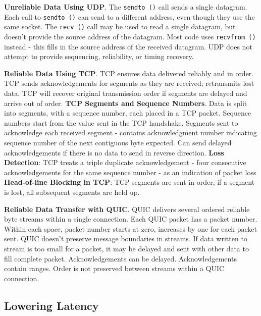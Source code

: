 \documentclass{article}
\begin{document}
\vspace{\baselineskip}
\textbf{Unreliable Data Using UDP}.
The \texttt{sendto ()} call sends a single datagram.
Each call to \texttt{sendto ()} can send to a different address, even though they use the same socket.
The \texttt{recv ()} call may be used to read a single datagram, but doesn't provide the source address of the datagram.
Most code uses \texttt{recvfrom ()} instead {-} this fills in the source address of the received datagram.
UDP does not attempt to provide sequencing, reliability, or timing recovery.

\vspace{\baselineskip}
\textbf{Reliable Data Using TCP}.
TCP ensures data delivered reliably and in order.
TCP sends acknowledgements for segments as they are received; retransmits lost data.
TCP will recover original transmission order if segments are delayed and arrive out of order.
\textbf{TCP Segments and Sequence Numbers}. Data is split into segments, with a sequence number, each placed in a TCP packet.
Sequence numbers start from the value sent in the TCP handshake.
Segments sent to acknowledge each received segment {-} contains acknowledgment number indicating sequence number of the next
contiguous byte expected.
Can send delayed acknowledgements if there is no data to send in reverse direction.
\textbf{Loss Detection}: TCP treats a triple duplicate acknowledgement {-} four consecutive acknowledgements for the same sequence
number {-} as an indication of packet loss
\textbf{Head-of-line Blocking in TCP}: TCP segments are sent in order, if a segment is lost, all subsequent segments are held up.

\vspace{\baselineskip}
\textbf{Reliable Data Transfer with QUIC}.
QUIC delivers several ordered reliable byte streams within a single connection.
Each QUIC packet has a packet number.
Within each space, packet number starts at zero, increases by one for each packet sent.
QUIC doesn’t preserve message boundaries in streams.
If data written to stream is too small for a packet, it may be
delayed and sent with other data to fill complete packet.
Acknowledgements can be delayed.
Acknowledgements contain ranges.
Order is not preserved between streams within a QUIC connection.

\clearpage

\subsection*{Lowering Latency}
\end{document}
